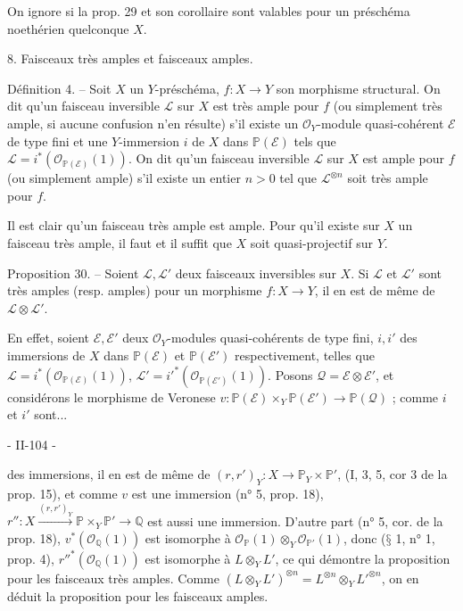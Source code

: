 On ignore si la prop. 29 et son corollaire sont valables pour un préschéma noethérien quelconque $X$.

8. Faisceaux très amples et faisceaux amples.

Définition 4. -- Soit $X$ un $Y$-préschéma, $f : X \to Y$ son morphisme structural. On dit qu'un faisceau inversible $\mathcal{L}$ sur $X$ est très ample pour $f$ (ou simplement très ample, si aucune confusion n'en résulte) s'il existe un $\mathcal{O}_Y$-module quasi-cohérent $\mathcal{E}$ de type fini et une $Y$-immersion $i$ de $X$ dans $\mathbb{P}(\mathcal{E})$ tels que $\mathcal{L} = i^*(\mathcal{O}_{\mathbb{P}(\mathcal{E})}(1))$. On dit qu'un faisceau inversible $\mathcal{L}$ sur $X$ est ample pour $f$ (ou simplement ample) s'il existe un entier $n > 0$ tel que $\mathcal{L}^{\otimes n}$ soit très ample pour $f$.

Il est clair qu'un faisceau très ample est ample. Pour qu'il existe sur $X$ un faisceau très ample, il faut et il suffit que $X$ soit quasi-projectif sur $Y$.

Proposition 30. -- Soient $\mathcal{L}, \mathcal{L}'$ deux faisceaux inversibles sur $X$. Si $\mathcal{L}$ et $\mathcal{L}'$ sont très amples (resp. amples) pour un morphisme $f : X \to Y$, il en est de même de $\mathcal{L} \otimes \mathcal{L}'$.

En effet, soient $\mathcal{E}, \mathcal{E}'$ deux $\mathcal{O}_Y$-modules quasi-cohérents de type fini, $i, i'$ des immersions de $X$ dans $\mathbb{P}(\mathcal{E})$ et $\mathbb{P}(\mathcal{E}')$ respectivement, telles que $\mathcal{L} = i^*(\mathcal{O}_{\mathbb{P}(\mathcal{E})}(1))$, $\mathcal{L}' = i'^*(\mathcal{O}_{\mathbb{P}(\mathcal{E}')}(1))$. Posons $\mathcal{Q} = \mathcal{E} \otimes \mathcal{E}'$, et considérons le morphisme de Veronese $v : \mathbb{P}(\mathcal{E}) \times_Y \mathbb{P}(\mathcal{E}') \to \mathbb{P}(\mathcal{Q})$ ; comme $i$ et $i'$ sont...

\newpage


- II-104 -

des immersions, il en est de même de $(r, r')_Y : X \to \mathbb{P}_Y \times \mathbb{P}'$, (I, 3, 5, cor 3 de la prop. 15), et comme $v$ est une immersion (n° 5, prop. 18), $r'' : X \xrightarrow{(r, r')_Y} \mathbb{P} \times_Y \mathbb{P}' \to \mathbb{Q}$ est aussi une immersion. D'autre part (n° 5, cor. de la prop. 18), $v^*(\mathcal{O}_{\mathbb{Q}}(1))$ est isomorphe à $\mathcal{O}_{\mathbb{P}}(1) \otimes_Y \mathcal{O}_{\mathbb{P}'}(1)$, donc ($§$ 1, n° 1, prop. 4), $r''^*(\mathcal{O}_{\mathbb{Q}}(1))$ est isomorphe à $L \otimes_Y L'$, ce qui démontre la proposition pour les faisceaux très amples. Comme $(L \otimes_Y L')^{\otimes n} = L^{\otimes n} \otimes_Y L'^{\otimes n}$, on en déduit la proposition pour les faisceaux amples.

